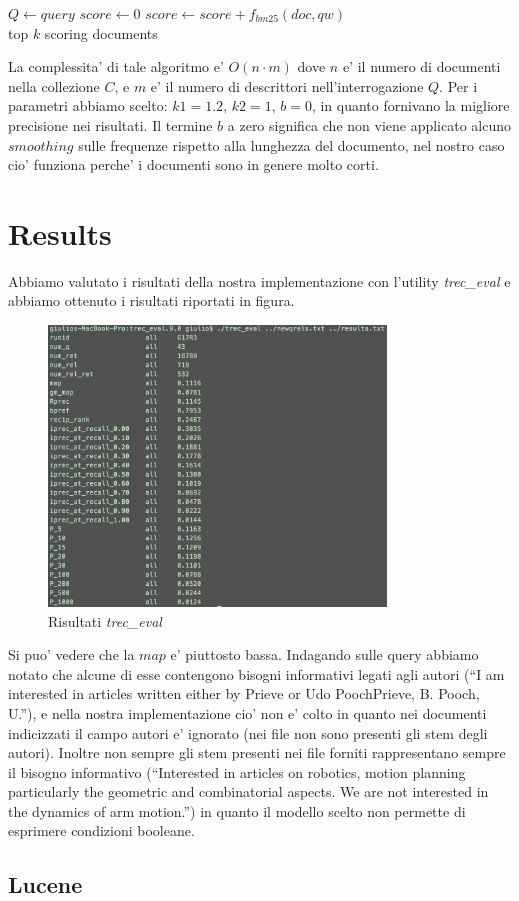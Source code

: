 \documentclass[12pt]{article}
\begin{document}
\begin{algorithmic}
\State $Q \gets query$
    \State $score\gets 0$
        \State $score \gets score + f_{bm25}(doc, qw)$
    \EndFor
\EndFor\\
\Return top $k$ scoring documents
\end{algorithmic}

La complessita' di tale algoritmo e' $O(n \cdot m)$ dove $n$ e' il numero di documenti nella collezione $C$, e $m$ e' il numero di descrittori nell'interrogazione $Q$. Per i parametri abbiamo scelto: $k1=1.2$, $k2=1$, $b=0$, in quanto fornivano la migliore precisione nei risultati. Il termine $b$ a zero significa che non viene applicato alcuno $smoothing$ sulle frequenze rispetto alla lunghezza del documento, nel nostro caso cio' funziona perche' i documenti sono in genere molto corti.

\section{Results}
Abbiamo valutato i risultati della nostra implementazione con l'utility \textit{trec\_eval} e abbiamo ottenuto i risultati riportati in figura.
\begin{figure}[htbp]
\begin{center}
\includegraphics[width=0.8\textwidth]{myresult.png}
\caption{Risultati \textit{trec\_eval}}
\label{default}
\end{center}
\end{figure}

Si puo' vedere che la $map$ e' piuttosto bassa. Indagando sulle query abbiamo notato che alcune di esse contengono bisogni informativi legati agli autori (``I am interested in articles written either by Prieve or Udo PoochPrieve, B. Pooch, U.''), e nella nostra implementazione cio' non e' colto in quanto nei documenti indicizzati il campo autori e' ignorato (nei file non sono presenti gli stem degli autori). Inoltre non sempre gli stem presenti nei file forniti rappresentano sempre il bisogno informativo (``Interested in articles on robotics, motion planning particularly the geometric and combinatorial aspects. We are not interested in the dynamics of arm motion.'') in quanto il modello scelto non permette di esprimere condizioni booleane.


\subsection{Lucene}



\end{document}
